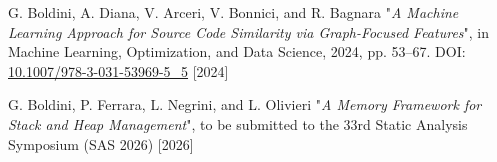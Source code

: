 


\begin{cvhonors}

\cvhonor
    {G. Boldini, A. Diana, V. Arceri, V. Bonnici, and R. Bagnara}
    {"\textit{A Machine Learning Approach for Source Code Similarity via Graph-Focused Features}",
     in Machine Learning, Optimization, and Data Science, 2024, pp. 53–67.
     DOI: \href{https://doi.org/10.1007/978-3-031-53969-5_5}{10.1007/978-3-031-53969-5\_5}}
    {}
    {[2024]}

\cvhonor
    {G. Boldini, P. Ferrara, L. Negrini, and L. Olivieri}
    {"\textit{A Memory Framework for Stack and Heap Management}",
     to be submitted to the 33rd Static Analysis Symposium (SAS 2026)}
    {}
    {[2026]}

\end{cvhonors}
